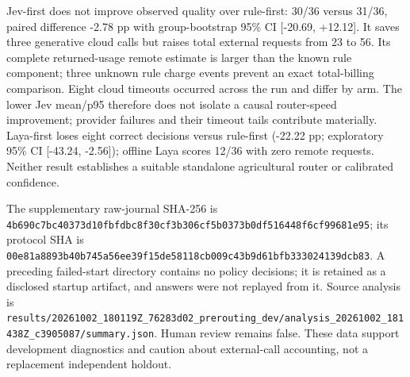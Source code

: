 \documentclass[10pt,a4paper,twocolumn]{article}
\begin{document}
\begin{table}[t]
\centering\small
\caption{Supplementary observed DEV comparison: 36 cases per arm, not a new confirmatory test. Remote cost column gives known USD plus the number of unknown charge events; these are not an invoice.}
\end{table}


Jev-first does not improve observed quality over rule-first: 30/36 versus 31/36, paired difference -2.78 pp with group-bootstrap 95\% CI [-20.69, +12.12]. It saves three generative cloud calls but raises total external requests from 23 to 56. Its complete returned-usage remote estimate is larger than the known rule component; three unknown rule charge events prevent an exact total-billing comparison. Eight cloud timeouts occurred across the run and differ by arm. The lower Jev mean/p95 therefore does not isolate a causal router-speed improvement; provider failures and their timeout tails contribute materially. Laya-first loses eight correct decisions versus rule-first (-22.22 pp; exploratory 95\% CI [-43.24, -2.56]); offline Laya scores 12/36 with zero remote requests. Neither result establishes a suitable standalone agricultural router or calibrated confidence.

The supplementary raw-journal SHA-256 is {\small\texttt{4b690c7b\allowbreak{}c40373d1\allowbreak{}0fbfdbc8\allowbreak{}f30cf3b3\allowbreak{}06cf5b03\allowbreak{}73b0df51\allowbreak{}6448f6cf\allowbreak{}99681e95}}; its protocol SHA is {\small\texttt{00e81a88\allowbreak{}93b40b74\allowbreak{}5a56ee39\allowbreak{}f15de581\allowbreak{}18cb009c\allowbreak{}43b9d61b\allowbreak{}fb333024\allowbreak{}139dcb83}}. A preceding failed-start directory contains no policy decisions; it is retained as a disclosed startup artifact, and answers were not replayed from it. Source analysis is \texttt{results/20261002\_180119Z\_76283d02\_prerouting\_dev/analysis\_20261002\_181438Z\_c3905087/summary.json}. Human review remains false. These data support development diagnostics and caution about external-call accounting, not a replacement independent holdout.
\end{document}
